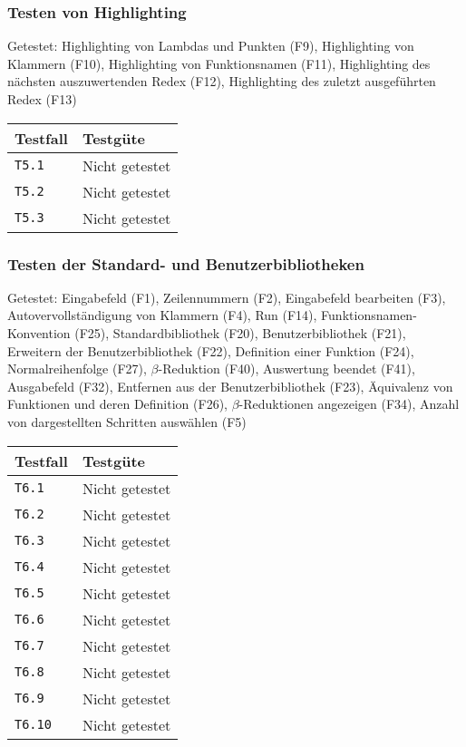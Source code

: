 \documentclass[parskip=full,11pt,twoside]{scrartcl}
\newcommand{\testline}[2]{
    \texttt{#1} & 
    \ifthenelse{\equal{#2}{Nicht getestet}}
        {\cellcolor{red!20}}
        {}
    \ifthenelse{\equal{#2}{Manuell getestet}}
        {\cellcolor{orange!20}}
        {}
    \ifthenelse{\equal{#2}{Automatisiert getestet}}
        {\cellcolor{green!20}}
        {}
    #2 \\ \hline
}
\begin{document}
\subsubsection{Testen von Highlighting}
    Getestet:
    Highlighting von Lambdas und Punkten (F9),
    Highlighting von Klammern (F10),
    Highlighting von Funktionsnamen (F11),
    Highlighting des nächsten auszuwertenden Redex (F12),
    Highlighting des zuletzt ausgeführten Redex (F13)

    \label{shortcuts}
    \begin{center}
        \begin{tabular}{ p{9cm} p{4cm}}
            Testfall & Testgüte \\ \hline
            \testline{T5.1}{Nicht getestet}
            \testline{T5.2}{Nicht getestet}
            \testline{T5.3}{Nicht getestet}
        \end{tabular}
    \end{center}

\subsubsection{Testen der Standard- und Benutzerbibliotheken}
    Getestet:
    Eingabefeld (F1),
    Zeilennummern (F2),
    Eingabefeld bearbeiten (F3),
    Autovervollständigung von Klammern (F4),
    Run (F14),
    Funktionsnamen-Konvention (F25),
    Standardbibliothek (F20),
    Benutzerbibliothek (F21),
    Erweitern der Benutzerbibliothek (F22),
    Definition einer Funktion (F24),
    Normalreihenfolge (F27),
    $\beta$-Reduktion (F40),
    Auswertung beendet (F41),
    Ausgabefeld (F32),
    Entfernen aus der Benutzerbibliothek (F23),
    Äquivalenz von Funktionen und deren Definition (F26),
    $\beta$-Reduktionen angezeigen (F34),
    Anzahl von dargestellten Schritten auswählen (F5)

    \label{shortcuts}
    \begin{center}
        \begin{tabular}{ p{9cm} p{4cm}}
            Testfall & Testgüte \\ \hline
            \testline{T6.1}{Nicht getestet}
            \testline{T6.2}{Nicht getestet}
            \testline{T6.3}{Nicht getestet}
            \testline{T6.4}{Nicht getestet}
            \testline{T6.5}{Nicht getestet}
            \testline{T6.6}{Nicht getestet}
            \testline{T6.7}{Nicht getestet}
            \testline{T6.8}{Nicht getestet}
            \testline{T6.9}{Nicht getestet}
            \testline{T6.10}{Nicht getestet}
        \end{tabular}
    \end{center}
\end{document}
